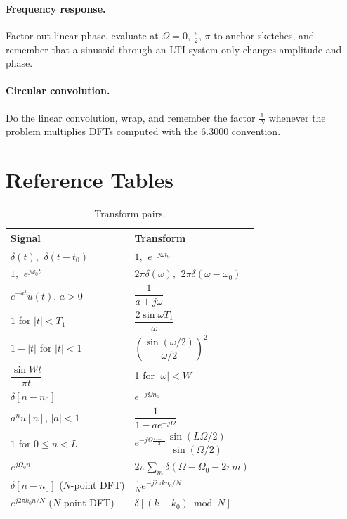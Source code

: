 \documentclass[11pt]{article}
\numberwithin{equation}{section}
\theoremstyle{definition}
\theoremstyle{remark}
\begin{document}
\paragraph{Frequency response.} Factor out linear phase, evaluate at $\Omega=0$, $\frac\pi2$, $\pi$
to anchor sketches, and remember that a sinusoid through an LTI system only changes amplitude and
phase.

\paragraph{Circular convolution.} Do the linear convolution, wrap, and remember the factor $\frac1N$
whenever the problem multiplies DFTs computed with the 6.3000 convention.

\appendix
\section{Reference Tables}

\begin{table}[h]
\centering
\begin{tabular}{@{}ll@{}}
\toprule
Signal & Transform\\
\midrule
$\delta(t)$, $\ \delta(t-t_0)$ & $1$, $\ e^{-j\omega t_0}$\\
$1$, $\ e^{j\omega_0t}$ & $2\pi\delta(\omega)$, $\ 2\pi\delta(\omega-\omega_0)$\\
$e^{-at}u(t)$, $a>0$ & $\dfrac{1}{a+j\omega}$\\[4pt]
$1$ for $|t|<T_1$ & $\dfrac{2\sin\omega T_1}{\omega}$\\[4pt]
$1-|t|$ for $|t|<1$ & $\left(\dfrac{\sin(\omega/2)}{\omega/2}\right)^2$\\[4pt]
$\dfrac{\sin Wt}{\pi t}$ & 1 for $|\omega|<W$\\
\midrule
$\delta[n-n_0]$ & $e^{-j\Omega n_0}$\\
$a^nu[n]$, $|a|<1$ & $\dfrac{1}{1-ae^{-j\Omega}}$\\[4pt]
$1$ for $0\le n<L$ & $e^{-j\Omega\frac{L-1}2}\dfrac{\sin(L\Omega/2)}{\sin(\Omega/2)}$\\[4pt]
$e^{j\Omega_0n}$ & $2\pi\sum_m\delta(\Omega-\Omega_0-2\pi m)$\\
\midrule
$\delta[n-n_0]$ ($N$-point DFT) & $\frac1Ne^{-j2\pi kn_0/N}$\\
$e^{j2\pi k_0n/N}$ ($N$-point DFT) & $\delta[(k-k_0)\bmod N]$\\
\bottomrule
\end{tabular}
\caption{Transform pairs.}
\end{table}
\end{document}
